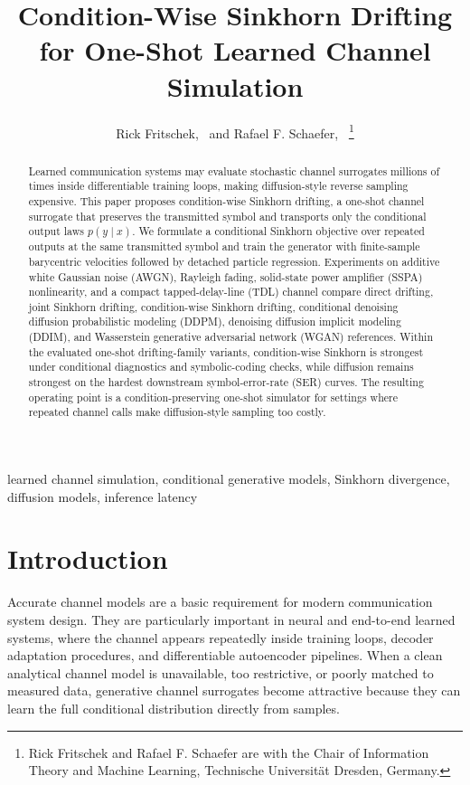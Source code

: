 \documentclass[10pt,journal]{IEEEtran}
\title{Condition-Wise Sinkhorn Drifting for One-Shot Learned Channel Simulation}
\author{Rick Fritschek,~\IEEEmembership{Member,~IEEE,} and Rafael F. Schaefer,~\IEEEmembership{Senior Member,~IEEE}%
\thanks{Rick Fritschek and Rafael F. Schaefer are with the Chair of Information Theory and Machine Learning, Technische Universit{\"a}t Dresden, Germany.}}
\begin{document}
\maketitle

\begin{abstract}
Learned communication systems may evaluate stochastic channel surrogates millions of times inside differentiable training loops, making diffusion-style reverse sampling expensive.
This paper proposes condition-wise Sinkhorn drifting, a one-shot channel surrogate that preserves the transmitted symbol and transports only the conditional output laws \(p(y\mid x)\).
We formulate a conditional Sinkhorn objective over repeated outputs at the same transmitted symbol and train the generator with finite-sample barycentric velocities followed by detached particle regression.
Experiments on additive white Gaussian noise (AWGN), Rayleigh fading, solid-state power amplifier (SSPA) nonlinearity, and a compact tapped-delay-line (TDL) channel compare direct drifting, joint Sinkhorn drifting, condition-wise Sinkhorn drifting, conditional denoising diffusion probabilistic modeling (DDPM), denoising diffusion implicit modeling (DDIM), and Wasserstein generative adversarial network (WGAN) references.
Within the evaluated one-shot drifting-family variants, condition-wise Sinkhorn is strongest under conditional diagnostics and symbolic-coding checks, while diffusion remains strongest on the hardest downstream symbol-error-rate (SER) curves.
The resulting operating point is a condition-preserving one-shot simulator for settings where repeated channel calls make diffusion-style sampling too costly.
\end{abstract}

\begin{IEEEkeywords}
learned channel simulation, conditional generative models, Sinkhorn divergence, diffusion models, inference latency
\end{IEEEkeywords}

\section{Introduction}
Accurate channel models are a basic requirement for modern communication system design.
They are particularly important in neural and end-to-end learned systems, where the channel appears repeatedly inside training loops, decoder adaptation procedures, and differentiable autoencoder pipelines.
When a clean analytical channel model is unavailable, too restrictive, or poorly matched to measured data, generative channel surrogates become attractive because they can learn the full conditional distribution directly from samples.
\end{document}
